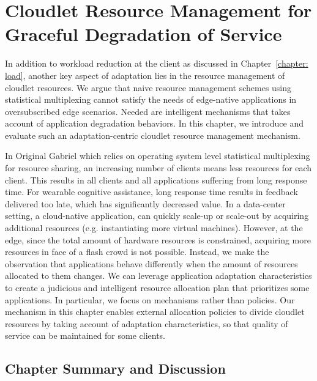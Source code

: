 \chapter{Cloudlet Resource Management for Graceful Degradation of Service}
\label{chapter: cloudlet}

In addition to workload reduction at the client as discussed in
Chapter~\ref{chapter: load}, another key aspect of adaptation lies in the
resource management of cloudlet resources. We argue that naive resource
management schemes using statistical multiplexing cannot satisfy the needs of
edge-native applications in oversubscribed edge scenarios. Needed are
intelligent mechanisms that takes account of application degradation behaviors.
In this chapter, we introduce and evaluate such an adaptation-centric cloudlet
resource management mechanism.

In Original Gabriel which relies on operating system level statistical
multiplexing for resource sharing, an increasing number of clients means less
resources for each client. This results in all clients and all applications
suffering from long response time. For wearable cognitive assistance, long
response time results in feedback delivered too late, which has significantly
decreased value. In a data-center setting, a cloud-native application, can
quickly scale-up or scale-out by acquiring additional resources (e.g.
instantiating more virtual machines). However, at the edge, since the total
amount of hardware resources is constrained, acquiring more resources in face of
a flash crowd is not possible. Instead, we make the observation that
applications behave differently when the amount of resources allocated to them
changes. We can leverage application adaptation characteristics to create a
judicious and intelligent resource allocation plan that prioritizes some
applications. In particular, we focus on mechanisms rather than policies. Our
mechanism in this chapter enables external allocation policies to divide
cloudlet resources by taking account of adaptation characteristics, so that
quality of service can be maintained for some clients.








\section{Chapter Summary and Discussion}
\label{cloudlet: summary}

